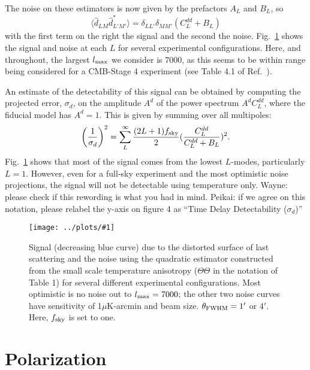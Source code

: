 \documentclass[prl,amsmath,amssymb,floatfix,superscriptaddress,nofootinbib,twocolumn]{revtex4-1}
\def\be{\begin{equation}}
\def\ee{\end{equation}}
\newcommand{\eql}[1]{\label{eq:#1}}
\newcommand{\sfig}[2]{
\texttt{[image: ../plots/\#1]}
        }
\newcommand{\Sfig}[2]{
   \begin{figure}[thbp]
   \begin{center}
    \sfig{#1.pdf}{\columnwidth}
    \caption{{\small #2}}
    \label{fig:#1}
     \end{center}
   \end{figure}
}
\newcommand{\rf}[1]{\ref{fig:#1}}
\newcommand{\scott}[1]{{\color{darkgreen} #1}}
\newcommand{\wh}[1]{{\color{red} #1}}
\begin{document}
The noise on these estimators is now given by the prefactors $A_L$ and $B_L$, so  
\be
\langle \hat d_{LM} \hat d^*_{L'M'}  \rangle = \delta_{LL'}\delta_{MM'} \left( C_L^{dd} + B_L \right)
\ee
with the first term on the right the signal and the second the noise. Fig.~\rf{Delay} shows the signal and noise at each $ L$ for several experimental configurations. Here, and throughout, the largest $l_{\rm max}$ we consider is 7000, as this seems to be within range being considered for a CMB-Stage 4 experiment (see Table 4.1 of Ref.~\cite{Abazajian:2016yjj}).

An estimate of the detectability of this signal can be obtained by computing the projected error, $\sigma_d$, on the amplitude $A^d$ of the power spectrum $A^dC_L^{dd}$, where the fiducial model has $A^d=1$. This is given by summing over all multipoles:
\be
\left(\frac{1}{\sigma_d}\right)^2 = \sum_L^{\infty} \frac{(2L+1)f_{\rm sky}}{2} (\frac{C_L^{dd}}{C_L^{dd}+B_L})^2\eql{sn}
.\ee
Fig.~\rf{Delay} shows that most of the signal comes from the lowest $L$-modes, particularly $L=1$. However, even for a full-sky experiment and the most optimistic noise projections, the signal will not be detectable using temperature only. \scott{Wayne: please check if this rewording is what you had in mind. Peikai: if we agree on this notation, please relabel the y-axis on figure 4 as ``Time Delay Detectability ($\sigma_d$)''}

\Sfig{Delay}{Signal (decreasing blue curve) due to the distorted surface of last scattering and the noise using the quadratic estimator constructed from the small scale temperature anisotropy ($\Theta\Theta$ in the notation of Table 1) for several different experimental configurations. Most optimistic is no noise out to $l_{\rm max}=7000$; the other two noise curves have sensitivity of 1$\mu$K-arcmin and beam size. %
$\theta_{\rm FWHM}=1'$ or $4'$. Here, $f_{\rm sky}$ is set to one.} %

\section{Polarization}
\end{document}
